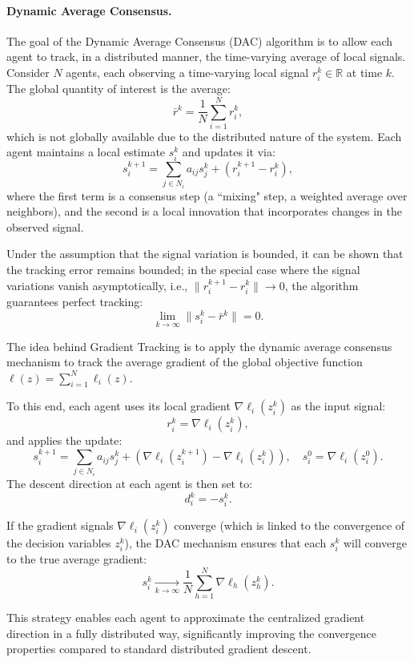 \paragraph{Dynamic Average Consensus.} 
\label{par:dynamic_avg}
The goal of the Dynamic Average Consensus (DAC) algorithm is to allow each agent to track, in a distributed manner, the time-varying average of local signals. Consider $N$ agents, each observing a time-varying local signal $r_i^k \in \mathbb{R}$ at time $k$. The global quantity of interest is the average:
\[
\bar{r}^k = \frac{1}{N} \sum_{i=1}^{N} r_i^k,
\]
which is not globally available due to the distributed nature of the system. Each agent maintains a local estimate $s_i^k$ and updates it via:
\[
s_i^{k+1} = \sum_{j \in N_i} a_{ij} s_j^k + \left( r_i^{k+1} - r_i^k \right),
\]
where the first term is a consensus step (a ``mixing" step, a weighted average over neighbors), and the second is a local innovation that incorporates changes in the observed signal.

Under the assumption that the signal variation is bounded, it can be shown that the tracking error remains bounded; in the special case where the signal variations vanish asymptotically, i.e., $\|r_i^{k+1} - r_i^k\| \to 0$, the algorithm guarantees perfect tracking:
\[
\lim_{k \to \infty} \|s_i^k - \bar{r}^k\| = 0.
\]

\medskip

The idea behind Gradient Tracking is to apply the dynamic average consensus mechanism to track the average gradient of the global objective function $\ell(z) = \sum_{i=1}^N \ell_i(z)$.

To this end, each agent uses its local gradient $\nabla \ell_i(z_i^k)$ as the input signal:
\[
r_i^k = \nabla \ell_i(z_i^k),
\]
and applies the update:
\[
s_i^{k+1} = \sum_{j \in N_i} a_{ij} s_j^k + \left( \nabla \ell_i(z_i^{k+1}) - \nabla \ell_i(z_i^k) \right), \quad s_i^0 = \nabla \ell_i(z_i^0).
\]
The descent direction at each agent is then set to:
\[
d_i^k = -s_i^k.
\]

If the gradient signals $\nabla \ell_i(z_i^k)$ converge (which is linked to the convergence of the decision variables $z_i^k$), the DAC mechanism ensures that each $s_i^k$ will converge to the true average gradient:
\[
s_i^k \xrightarrow[k \to \infty]{} \frac{1}{N} \sum_{h=1}^{N} \nabla \ell_h(z_h^k).
\]

This strategy enables each agent to approximate the centralized gradient direction in a fully distributed way, significantly improving the convergence properties compared to standard distributed gradient descent.

